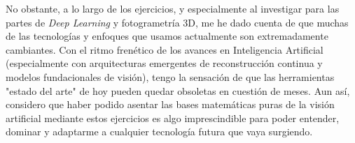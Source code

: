 \documentclass[12pt,a4paper]{article}
\begin{document}
No obstante, a lo largo de los ejercicios, y especialmente al investigar para las partes de \textit{Deep Learning} y fotogrametría 3D, me he dado cuenta de que muchas de las tecnologías y enfoques que usamos actualmente son extremadamente cambiantes. Con el ritmo frenético de los avances en Inteligencia Artificial (especialmente con arquitecturas emergentes de reconstrucción continua y modelos fundacionales de visión), tengo la sensación de que las herramientas "estado del arte" de hoy pueden quedar obsoletas en cuestión de meses. Aun así, considero que haber podido asentar las bases matemáticas puras de la visión artificial mediante estos ejercicios es algo imprescindible para poder entender, dominar y adaptarme a cualquier tecnología futura que vaya surgiendo.
\end{document}
